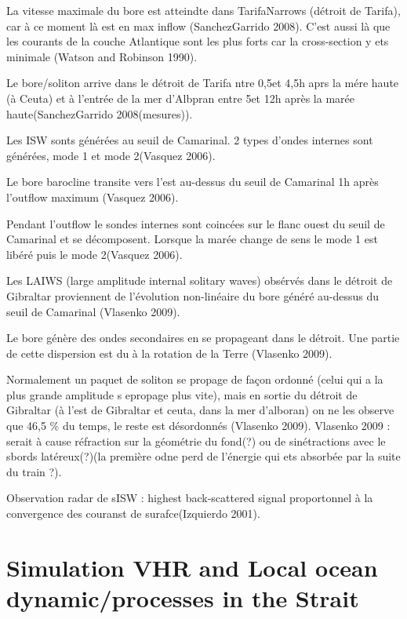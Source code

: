 La vitesse maximale du bore est atteindte dans TarifaNarrows (détroit de Tarifa), car à ce moment là est en max inflow (SanchezGarrido 2008). C’est aussi là que les courants de la couche Atlantique sont les plus forts car la cross-section y ets minimale (Watson and Robinson 1990).

Le bore/soliton arrive dans le détroit de Tarifa ntre 0,5et 4,5h aprs la mére haute (à Ceuta) et à l’entrée de la mer d’Albpran entre 5et 12h après la marée haute(SanchezGarrido 2008(mesures)).

Les ISW sonts générées au seuil de Camarinal. 2 types d’ondes internes sont générées, mode 1 et mode 2(Vasquez 2006).

Le bore barocline transite vers l’est au-dessus du seuil de Camarinal 1h après l’outflow maximum (Vasquez 2006).

Pendant l’outflow le sondes internes sont coincées sur le flanc ouest du seuil de Camarinal et se décomposent. Lorsque la marée change de sens le mode 1 est libéré puis le mode 2(Vasquez 2006).

Les LAIWS (large amplitude internal solitary waves) obsérvés dans le détroit de Gibraltar proviennent de l’évolution non-linéaire du bore généré au-dessus du seuil de Camarinal (Vlasenko 2009).

Le bore génère des ondes secondaires en se propageant dans le détroit. Une partie de cette dispersion est du à la rotation de la Terre (Vlasenko 2009).

Normalement un paquet de soliton se propage de façon ordonné (celui qui a la plus grande amplitude s epropage plus vite), mais en sortie du détroit de Gibraltar (à l’est de Gibraltar et ceuta, dans la mer d’alboran) on ne les observe que 46,5 \% du temps, le reste est désordonnés (Vlasenko 2009).  Vlasenko 2009 : serait à cause réfraction sur la géométrie du fond(?) ou de sinétractions avec le sbords latéreux(?)(la première odne perd de l’énergie qui ets absorbée par la suite du train ?).

Observation radar de sISW : highest back-scattered signal proportonnel à la convergence des couranst de surafce(Izquierdo 2001).






\section{Simulation VHR and Local ocean dynamic/processes in the Strait}

